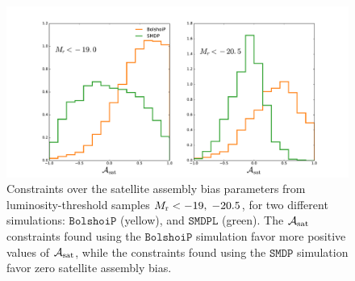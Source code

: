 \documentclass[twocolumn]{aastex61}
\newcommand{\asat}{\mathcal{A}_{\rm sat}}
\begin{document}
\begin{figure}[p]~\\
\begin{center}
\includegraphics[width=\textwidth]{hist_comparison.pdf}
\caption{Constraints over the satellite assembly bias parameters from luminosity-threshold samples $M_{\rm r}<-19 ,\; -20.5$, for two different simulations: $\mathtt{BolshoiP}$ (yellow), and $\mathtt{SMDPL}$ (green). The $\asat$ constraints found using the $\mathtt{BolshoiP}$ simulation favor more positive values of $\asat$, while the constraints found using the $\mathtt{SMDP}$ simulation favor zero satellite assembly bias.}
\label{fig:asat_comparison}
\end{center}
\end{figure}

\end{document}
